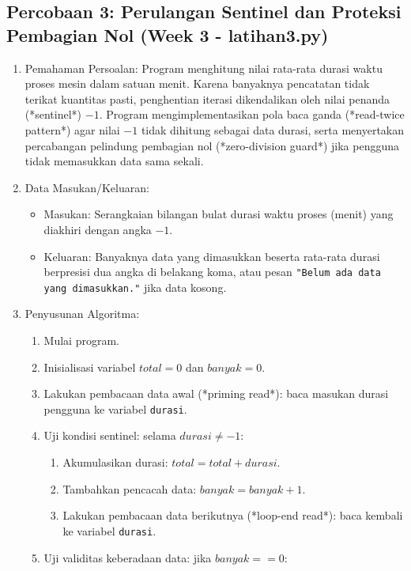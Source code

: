 \documentclass[12pt,a4paper]{article}
\begin{document}
\subsection{Percobaan 3: Perulangan Sentinel dan Proteksi Pembagian Nol (Week 3 - latihan3.py)}
\begin{enumerate}
    \item Pemahaman Persoalan: Program menghitung nilai rata-rata durasi waktu proses mesin dalam satuan menit. Karena banyaknya pencatatan tidak terikat kuantitas pasti, penghentian iterasi dikendalikan oleh nilai penanda (*sentinel*) $-1$. Program mengimplementasikan pola baca ganda (*read-twice pattern*) agar nilai $-1$ tidak dihitung sebagai data durasi, serta menyertakan percabangan pelindung pembagian nol (*zero-division guard*) jika pengguna tidak memasukkan data sama sekali.
    \item Data Masukan/Keluaran:
    \begin{itemize}
        \item Masukan: Serangkaian bilangan bulat durasi waktu proses (menit) yang diakhiri dengan angka $-1$.
        \item Keluaran: Banyaknya data yang dimasukkan beserta rata-rata durasi berpresisi dua angka di belakang koma, atau pesan \texttt{"Belum ada data yang dimasukkan."} jika data kosong.
    \end{itemize}
    \item Penyusunan Algoritma:
    \begin{enumerate}[label=\alph*.]
        \item Mulai program.
        \item Inisialisasi variabel $total = 0$ dan $banyak = 0$.
        \item Lakukan pembacaan data awal (*priming read*): baca masukan durasi pengguna ke variabel \texttt{durasi}.
        \item Uji kondisi sentinel: selama $durasi \ne -1$:
        \begin{enumerate}[label=\roman*.]
            \item Akumulasikan durasi: $total = total + durasi$.
            \item Tambahkan pencacah data: $banyak = banyak + 1$.
            \item Lakukan pembacaan data berikutnya (*loop-end read*): baca kembali ke variabel \texttt{durasi}.
        \end{enumerate}
        \item Uji validitas keberadaan data: jika $banyak == 0$:

\end{enumerate}
\end{enumerate}
\end{document}

